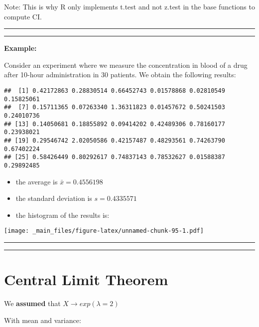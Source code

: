 \documentclass[
]{book}
\begin{document}
Note: This is why R only implements t.test and not z.test in the base functions to compute CI.

\begin{center}\rule{0.5\linewidth}{0.5pt}\end{center}

\begin{center}\rule{0.5\linewidth}{0.5pt}\end{center}

\textbf{Example:}

Consider an experiment where we measure the concentration in blood of a drug after 10-hour administration in \(30\) patients. We obtain the following results:

\begin{verbatim}
##  [1] 0.42172863 0.28830514 0.66452743 0.01578868 0.02810549 0.15825061
##  [7] 0.15711365 0.07263340 1.36311823 0.01457672 0.50241503 0.24010736
## [13] 0.14050681 0.18855892 0.09414202 0.42489306 0.78160177 0.23938021
## [19] 0.29546742 2.02050586 0.42157487 0.48293561 0.74263790 0.67402224
## [25] 0.58426449 0.80292617 0.74837143 0.78532627 0.01588387 0.29892485
\end{verbatim}

\begin{itemize}
\item
  the average is \(\bar{x}=0.4556198\)
\item
  the standard deviation is \(s=0.4335571\)
\item
  the histogram of the results is:
\end{itemize}

\texttt{[image: \_main\_files/figure-latex/unnamed-chunk-95-1.pdf]}

\begin{center}\rule{0.5\linewidth}{0.5pt}\end{center}

\begin{center}\rule{0.5\linewidth}{0.5pt}\end{center}

\hypertarget{central-limit-theorem-4}{%
\section{Central Limit Theorem}\label{central-limit-theorem-4}}

We \textbf{assumed} that \(X \rightarrow exp(\lambda=2)\)

With mean and variance:
\end{document}
